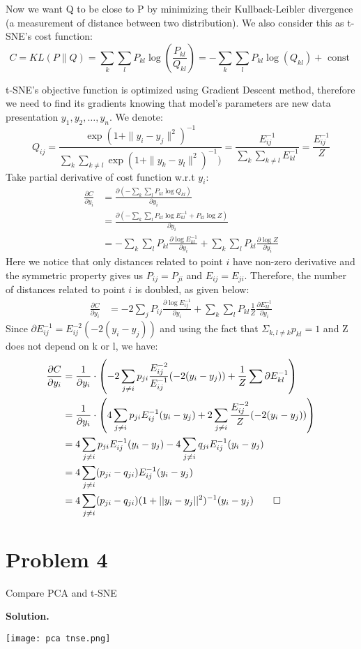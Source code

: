 \documentclass[a4paper, 12pt]{article}  %
\begin{document}
Now we want Q to be close to P by minimizing their Kullback-Leibler divergence (a measurement of distance between two distribution). We also consider this as t-SNE's cost function:
\[C = KL(P\|Q) = \sum_k \sum_l P_{kl} \log \left( \frac{P_{kl}}{Q_{kl}} \right) = -\sum_k \sum_l P_{kl} \log (Q_{kl}) + \text{ const }\]

t-SNE's objective function is optimized using Gradient Descent method, therefore we need to find its gradients knowing that model's parameters are new data presentation $y_1, y_2, \hdots, y_n$. We denote:
\[Q_{ij} = \frac{\exp (1 + \|y_i - y_j\|^2)^{-1}}{\sum_k \sum_{k \neq l} \exp (1 + \|y_k - y_l\|^2)^{-1})} = \frac{E_{ij}^{-1}}{\sum_k\sum_{k \neq l} E_{kl}^{-1}}  = \frac{E_{ij}^{-1}}{Z}\]
Take partial derivative of cost function w.r.t $y_i$:
\begin{align*}
    \frac{\partial C}{\partial y_i} &= \frac{\partial (-\sum_k\sum_l P_{kl} \log Q_{kl})}{\partial y_i} \\
    &= \frac{\partial (-\sum_k\sum_l P_{kl} \log E_{kl}^{-1} + P_{kl} \log Z)}{\partial y_i} \\
    &= -\sum_k\sum_l P_{kl} \frac{\partial \log E_{kl}^{-1}}{\partial y_i} + \sum_k\sum_l P_{kl} \frac{\partial \log Z}{\partial y_i} 
\end{align*}
Here we notice that only distances related to point $i$ have non-zero derivative and the symmetric property gives us $P_{ij} = P_{ji}$ and $E_{ij} = E_{ji}$. Therefore, the number of distances related to point $i$ is doubled, as given below:
\begin{align*}
    \frac{\partial C}{\partial y_i} &= -2 \sum_j P_{ij} \frac{\partial \log E_{ij}^{-1}}{\partial y_i} + \sum_k\sum_l P_{kl} \frac{1}{Z} \frac{\partial E_{kl}^{-1}}{\partial y_i}
\end{align*}
Since \(\partial E_{ij}^{-1}  = E_{ij}^{-2}(-2(y_i - y_j))\) and using the fact that \(\Sigma_{k, l \neq k} p_{kl} = 1\) and Z does not depend on k or l, we have:
\begin{align*}
    \frac{\partial C}{\partial y_i} &= \frac{1}{\partial y_i} \cdot \left( -2 \sum_{j \neq i} p_{ji} \frac{E_{ij}^{-2}}{E_{ij}^{-1}}(-2(y_i - y_j)) + \frac{1}{Z} \sum \partial E_{kl}^{-1}\right)\\
    &= \frac{1}{\partial y_i} \cdot \left(4 \sum_{j \neq i} p_{ji} E_{ij}^{-1} (y_i - y_j) + 2 \sum_{j \neq i}  \frac{E_{ij}^{-2}}{Z}(-2(y_i - y_j))\right)\\
    &= 4 \sum_{j \neq i} p_{ji} E_{ij}^{-1} (y_i - y_j) -  4 \sum_{j \neq i} q_{ji} E_{ij}^{-1} (y_i - y_j)\\
    &= 4 \sum_{j \neq i} (p_{ji} - q_{ji}) E_{ij}^{-1} (y_i - y_j) \\
    &= 4 \sum_{j \neq i} (p_{ji} - q_{ji}) (1 + || y_i - y_j ||^2)^{-1} (y_i - y_j) \qed
\end{align*}

\section*{Problem 4}

Compare PCA and t-SNE

\textbf{Solution.}\\
\begin{center}
    \texttt{[image: pca tnse.png]}
\end{center}
\end{document}
